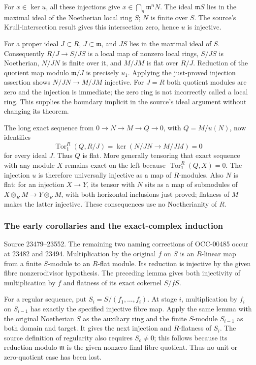 For \(x\in\ker u\), all these injections give \(x\in\bigcap_n\mathfrak m^nN\). The ideal \(\mathfrak mS\) lies in the maximal ideal of the Noetherian local ring \(S\); \(N\) is finite over \(S\). The source's Krull-intersection result gives this intersection zero, hence \(u\) is injective.

For a proper ideal \(J\subset R\), \(J\subset\mathfrak m\), and \(JS\) lies in the maximal ideal of \(S\). Consequently \(R/J\to S/JS\) is a local map of nonzero local rings, \(S/JS\) is Noetherian, \(N/JN\) is finite over it, and \(M/JM\) is flat over \(R/J\). Reduction of the quotient map modulo \(\mathfrak m/J\) is precisely \(u_1\). Applying the just-proved injection assertion shows \(N/JN\to M/JM\) injective. For \(J=R\) both quotient modules are zero and the injection is immediate; the zero ring is not incorrectly called a local ring. This supplies the boundary implicit in the source's ideal argument without changing its theorem.

The long exact sequence from \(0\to N\to M\to Q\to0\), with \(Q=M/u(N)\), now identifies \[
\operatorname{Tor}_1^R(Q,R/J)
 =\ker(N/JN\to M/JM)=0
\] for every ideal \(J\). Thus \(Q\) is flat. More generally tensoring that exact sequence with any module \(X\) remains exact on the left because \(\operatorname{Tor}_1^R(Q,X)=0\). The injection \(u\) is therefore universally injective as a map of \(R\)-modules. Also \(N\) is flat: for an injection \(X\to Y\), its tensor with \(N\) sits as a map of submodules of \(X\otimes_RM\to Y\otimes_RM\), with both horizontal inclusions just proved; flatness of \(M\) makes the latter injective. These consequences use no Noetherianity of \(R\).

\subsubsection{The early corollaries and the exact-complex induction}\label{algebra-proof-016-the-early-corollaries-and-the-exact-complex-induction}

Source 23479--23552. The remaining two naming corrections of OCC-00485 occur at 23482 and 23494. Multiplication by the original \(f\) on \(S\) is an \(R\)-linear map from a finite \(S\)-module to an \(R\)-flat module. Its reduction is injective by the given fibre nonzerodivisor hypothesis. The preceding lemma gives both injectivity of multiplication by \(f\) and flatness of its exact cokernel \(S/fS\).

For a regular sequence, put \(S_i=S/(f_1,\ldots,f_i)\). At stage \(i\), multiplication by \(f_i\) on \(S_{i-1}\) has exactly the specified injective fibre map. Apply the same lemma with the original Noetherian \(S\) as the auxiliary ring and the finite \(S\)-module \(S_{i-1}\) as both domain and target. It gives the next injection and \(R\)-flatness of \(S_i\). The source definition of regularity also requires \(S_c\ne0\); this follows because its reduction modulo \(\mathfrak m\) is the given nonzero final fibre quotient. Thus no unit or zero-quotient case has been lost.

